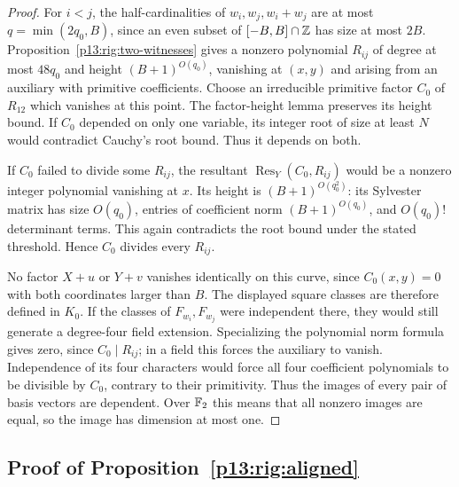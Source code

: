 \begin{proof}
For $i<j$, the half-cardinalities of $w_i,w_j,w_i+w_j$
are at most $q=\min(2q_0,B)$, since an even subset of
$[-B,B]\cap\mathbb Z$ has size at most $2B$.
Proposition~\ref{p13:rig:two-witnesses} gives a nonzero
polynomial $R_{ij}$ of degree at most $48q_0$ and height
$(B+1)^{O(q_0)}$, vanishing at $(x,y)$ and arising from
an auxiliary with primitive coefficients.
Choose an irreducible primitive factor $C_0$ of $R_{12}$
which vanishes at this point.  The factor-height lemma
preserves its height bound.  If $C_0$ depended on only one
variable, its integer root of size at least $N$ would
contradict Cauchy's root bound.  Thus it depends on both.

If $C_0$ failed to divide some $R_{ij}$, the resultant
$\operatorname{Res}_Y(C_0,R_{ij})$ would be a nonzero integer
polynomial vanishing at $x$.  Its height is
$(B+1)^{O(q_0^2)}$: its Sylvester matrix has size $O(q_0)$,
entries of coefficient norm $(B+1)^{O(q_0)}$, and
$O(q_0)!$ determinant terms.  This again contradicts the
root bound under the stated threshold.  Hence $C_0$ divides
every $R_{ij}$.

No factor $X+u$ or $Y+v$ vanishes identically on this curve,
since $C_0(x,y)=0$ with both coordinates larger than $B$.
The displayed square classes are therefore defined in
$K_0$.  If the classes of $F_{w_i},F_{w_j}$ were independent
there, they would still generate a degree-four field
extension.  Specializing the polynomial norm formula gives
zero, since $C_0\mid R_{ij}$; in a field this forces the
auxiliary to vanish.  Independence of its four characters
would force all four coefficient polynomials to be divisible
by $C_0$, contrary to their primitivity.  Thus the images
of every pair of basis vectors are dependent.  Over $\mathbb F_2$
this means that all nonzero images are equal, so the image
has dimension at most one.
\end{proof}

\subsection{Proof of Proposition~\ref{p13:rig:aligned}}
\label{p14:comp:rigidity:aligned}

